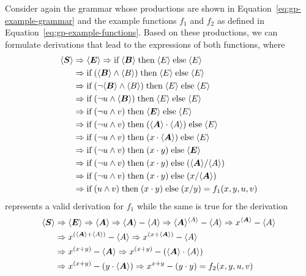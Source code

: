Consider again the grammar whose productions are shown in Equation~\eqref{eq:gp-example-grammar} and the example functions $f_1$ and $f_2$ as defined in Equation~\eqref{eq:gp-example-functions}.
Based on these productions, we can formulate derivations that lead to the expressions of both functions, where
\begin{equation}
	\begin{aligned}
		\langle \bm{S} \rangle & \Rightarrow \langle \bm{E} \rangle \Rightarrow \text{if} \; \langle \bm{B} \rangle \; \text{then} \; \langle E \rangle \; \text{else} \; \langle E \rangle 
		\\ & \Rightarrow \text{if} \; (\langle \bm{B} \rangle \wedge \langle B \rangle) \; \text{then} \; \langle E \rangle \; \text{else} \; \langle E \rangle
		\\ & \Rightarrow \text{if} \; (\neg \langle \bm{B} \rangle \wedge \langle B \rangle) \; \text{then} \; \langle E \rangle \; \text{else} \; \langle E \rangle 
		\\ & \Rightarrow \text{if} \; (\neg u \wedge \langle \bm{B} \rangle) \; \text{then} \; \langle E \rangle \; \text{else} \; \langle E \rangle 
		\\ & \Rightarrow \text{if} \; (\neg u \wedge v) \; \text{then} \; \langle \bm{E} \rangle \; \text{else} \; \langle E \rangle 	
		\\ & \Rightarrow \text{if} \; (\neg u \wedge v) \; \text{then} \; (\langle \bm{A} \rangle \cdot \langle A \rangle) \; \text{else} \; \langle E \rangle 	 
		\\ & \Rightarrow \text{if} \; (\neg u \wedge v) \; \text{then} \; (x \cdot \langle \bm{A} \rangle) \; \text{else} \; \langle E \rangle 
		\\ & \Rightarrow \text{if} \; (\neg u \wedge v) \; \text{then} \; (x \cdot y) \; \text{else} \; \langle \bm{E} \rangle
		\\ & \Rightarrow \text{if} \; (\neg u \wedge v) \; \text{then} \; (x \cdot y) \; \text{else} \; (\langle \bm{A} \rangle / \langle A \rangle)
		\\ & \Rightarrow \text{if} \; (\neg u \wedge v) \; \text{then} \; (x \cdot y) \; \text{else} \; (x / \langle \bm{A} \rangle)
		\\ & \Rightarrow \text{if} \; (u \wedge v) \; \text{then} \; (x \cdot y) \; \text{else} \; (x / y) = f_1(x,y,u,v)
	\end{aligned}
\end{equation}
represents a valid derivation for $f_1$ while the same is true for the derivation
\begin{equation}
\begin{aligned}
	\langle \bm{S} \rangle & \Rightarrow \langle \bm{E} \rangle \Rightarrow \langle \bm{A} \rangle \Rightarrow \langle \bm{A} \rangle - \langle A \rangle \Rightarrow \langle \bm{A} \rangle^{\langle A \rangle} - \langle A \rangle
	\Rightarrow x^{\langle \bm{A} \rangle} - \langle A \rangle 	
	\\ & \Rightarrow x^{(\langle \bm{A} \rangle + \langle A \rangle)} - \langle A \rangle \Rightarrow x^{(x + \langle \bm{A} \rangle)} - \langle A \rangle 
	\\ & \Rightarrow x^{(x + y)} - \langle \bm{A} \rangle \Rightarrow x^{(x + y)} - (\langle \bm{A} \rangle \cdot \langle A \rangle) 
	\\ & \Rightarrow x^{(x + y)} - (y \cdot \langle \bm{A} \rangle) \Rightarrow x^{x + y} - (y \cdot y) = f_2(x,y,u,v)
\end{aligned}
\end{equation}
